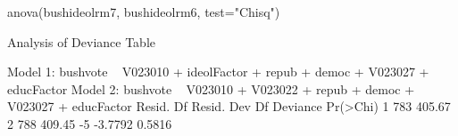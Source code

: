 \begin{Schunk}
\begin{Sinput}
 anova(bushideolrm7, bushideolrm6, test="Chisq")
\end{Sinput}
\begin{Soutput}
Analysis of Deviance Table

Model 1: bushvote ~ V023010 + ideolFactor + repub + democ + V023027 + 
    educFactor
Model 2: bushvote ~ V023010 + V023022 + repub + democ + V023027 + educFactor
  Resid. Df Resid. Dev Df Deviance Pr(>Chi)
1       783     405.67                     
2       788     409.45 -5  -3.7792   0.5816
\end{Soutput}
\end{Schunk}
